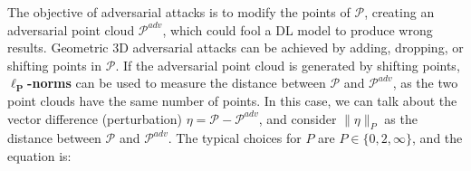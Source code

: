 \documentclass{ieeeaccess}
\begin{document}
The objective of adversarial attacks is to modify the points of $\mathcal{P}$, creating an adversarial point cloud $\mathcal{P}^{adv}$, which could fool a DL model to produce wrong results. 
Geometric 3D adversarial attacks can be achieved by adding, dropping, or shifting points in $\mathcal{P}$. %
If the adversarial point cloud is generated by shifting points, $\boldsymbol{\ell_P}$\textbf{-norms} can be used to measure the distance between $\mathcal{P}$ and $\mathcal{P}^{adv}$, as the two %
point clouds have the same %
number of points. In this case, we can talk about the vector difference (perturbation) $\eta = \mathcal{P}-\mathcal{P}^{adv}$, and consider $\|\eta\|_P$ as the distance between $\mathcal{P}$ and $\mathcal{P}^{adv}$. The typical choices for $P$ are $P \in \{0, 2, \infty\}$, and the equation is:
\end{document}
